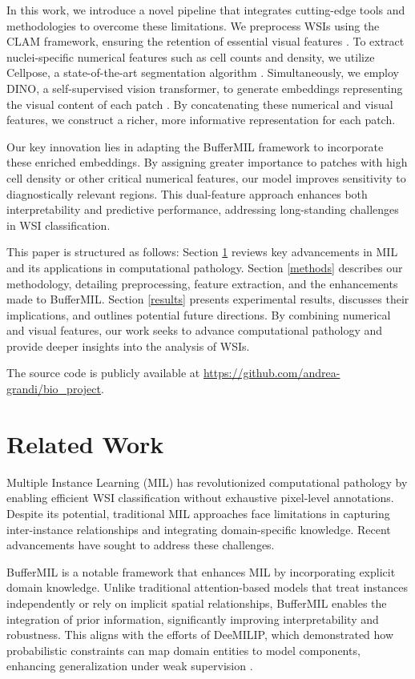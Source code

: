 \documentclass[10pt,twocolumn]{article}
\begin{document}
In this work, we introduce a novel pipeline that integrates cutting-edge tools and methodologies to overcome these limitations. We preprocess WSIs using the CLAM framework, ensuring the retention of essential visual features \cite{lu2021clam}. To extract nuclei-specific numerical features such as cell counts and density, we utilize Cellpose, a state-of-the-art segmentation algorithm \cite{stringer2021cellpose}. Simultaneously, we employ DINO, a self-supervised vision transformer, to generate embeddings representing the visual content of each patch \cite{caron2021emerging}. By concatenating these numerical and visual features, we construct a richer, more informative representation for each patch.

Our key innovation lies in adapting the BufferMIL framework to incorporate these enriched embeddings. By assigning greater importance to patches with high cell density or other critical numerical features, our model improves sensitivity to diagnostically relevant regions. This dual-feature approach enhances both interpretability and predictive performance, addressing long-standing challenges in WSI classification.

This paper is structured as follows: Section \ref{related} reviews key advancements in MIL and its applications in computational pathology. Section \ref{methods} describes our methodology, detailing preprocessing, feature extraction, and the enhancements made to BufferMIL. Section \ref{results} presents experimental results, discusses their implications, and outlines potential future directions. By combining numerical and visual features, our work seeks to advance computational pathology and provide deeper insights into the analysis of WSIs.

The source code is publicly available at \url{https://github.com/andrea-grandi/bio_project}.


\section{Related Work} \label{related}
Multiple Instance Learning (MIL) has revolutionized computational pathology by enabling efficient WSI classification without exhaustive pixel-level annotations. Despite its potential, traditional MIL approaches face limitations in capturing inter-instance relationships and integrating domain-specific knowledge. Recent advancements have sought to address these challenges.

BufferMIL \cite{10.1007/978-3-031-43153-1_1} is a notable framework that enhances MIL by incorporating explicit domain knowledge. Unlike traditional attention-based models that treat instances independently or rely on implicit spatial relationships, BufferMIL enables the integration of prior information, significantly improving interpretability and robustness. This aligns with the efforts of DeeMILIP, which demonstrated how probabilistic constraints can map domain entities to model components, enhancing generalization under weak supervision \cite{hajj2024}.
\end{document}

